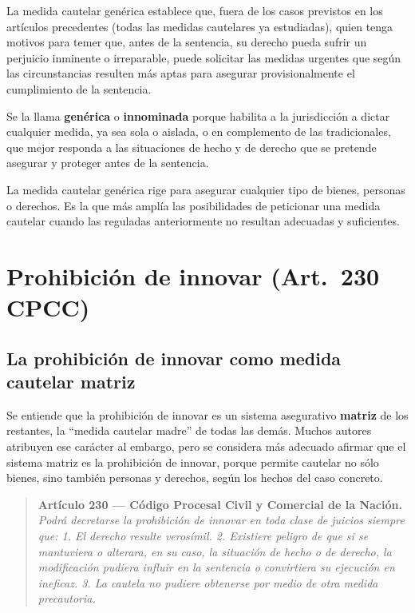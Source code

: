 \documentclass[12pt,oneside]{book}
\begin{document}
La medida cautelar genérica establece que, fuera de los casos previstos en los artículos precedentes (todas las medidas cautelares ya estudiadas), quien tenga motivos para temer que, antes de la sentencia, su derecho pueda sufrir un perjuicio inminente o irreparable, puede solicitar las medidas urgentes que según las circunstancias resulten más aptas para asegurar provisionalmente el cumplimiento de la sentencia.

Se la llama \textbf{genérica} o \textbf{innominada} porque habilita a la jurisdicción a dictar cualquier medida, ya sea sola o aislada, o en complemento de las tradicionales, que mejor responda a las situaciones de hecho y de derecho que se pretende asegurar y proteger antes de la sentencia.

\begin{important}
La medida cautelar genérica rige para asegurar cualquier tipo de bienes, personas o derechos. Es la que más amplía las posibilidades de peticionar una medida cautelar cuando las reguladas anteriormente no resultan adecuadas y suficientes.
\end{important}

\section{Prohibición de innovar (Art.~230 CPCC)}

\subsection{La prohibición de innovar como medida cautelar matriz}

Se entiende que la prohibición de innovar es un sistema asegurativo \textbf{matriz} de los restantes, la ``medida cautelar madre'' de todas las demás. Muchos autores atribuyen ese carácter al embargo, pero se considera más adecuado afirmar que el sistema matriz es la prohibición de innovar, porque permite cautelar no sólo bienes, sino también personas y derechos, según los hechos del caso concreto.

\begin{quote}
\small
\textbf{Artículo 230 --- Código Procesal Civil y Comercial de la Nación.} \textit{Podrá decretarse la prohibición de innovar en toda clase de juicios siempre que: 1. El derecho resulte verosímil. 2. Existiere peligro de que si se mantuviera o alterara, en su caso, la situación de hecho o de derecho, la modificación pudiera influir en la sentencia o convirtiera su ejecución en ineficaz. 3. La cautela no pudiere obtenerse por medio de otra medida precautoria.}
\end{quote}
\end{document}

